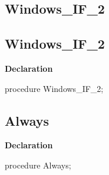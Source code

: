 \documentclass{report}
\newif\ifpdf
\begin{document}
\subsection*{\large{\textbf{Windows{\_}IF{\_}2}}\normalsize\hspace{1ex}\hrulefill}
\else
\subsection*{Windows{\_}IF{\_}2}
\fi
\label{ok_if_expressions-Windows_IF_2}
\begin{list}{}{
\setlength{\itemindent}{0cm}
\setlength{\listparindent}{0cm}
\setlength{\leftmargin}{\evensidemargin}
\addtolength{\leftmargin}{\tmplength}
\settowidth{\labelsep}{X}
\addtolength{\leftmargin}{\labelsep}
\setlength{\labelwidth}{\tmplength}
}
\item[\textbf{Declaration}\hfill]
\ifpdf
\begin{flushleft}
\fi
\begin{ttfamily}
procedure Windows{\_}IF{\_}2;\end{ttfamily}

\ifpdf
\end{flushleft}
\fi

\end{list}
\ifpdf
\subsection*{\large{\textbf{Always}}\normalsize\hspace{1ex}\hrulefill}
\else
\subsection*{Always}
\fi
\label{ok_if_expressions-Always}
\begin{list}{}{
\setlength{\itemindent}{0cm}
\setlength{\listparindent}{0cm}
\setlength{\leftmargin}{\evensidemargin}
\addtolength{\leftmargin}{\tmplength}
\settowidth{\labelsep}{X}
\addtolength{\leftmargin}{\labelsep}
\setlength{\labelwidth}{\tmplength}
}
\item[\textbf{Declaration}\hfill]
\ifpdf
\begin{flushleft}
\fi
\begin{ttfamily}
procedure Always;\end{ttfamily}

\ifpdf
\end{flushleft}
\fi

\end{list}
\end{document}
